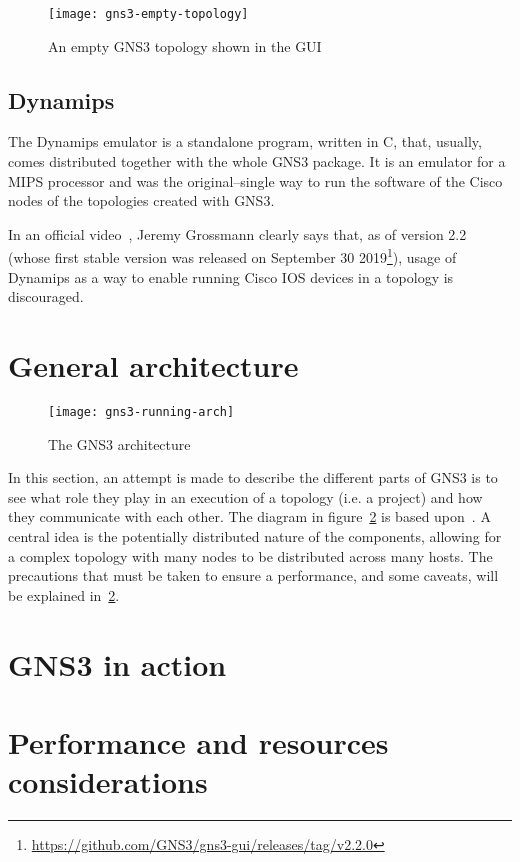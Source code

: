 \begin{figure}
  \centering
  \texttt{[image: gns3-empty-topology]}
  \caption{An empty GNS3 topology shown in the GUI}
  \label{fig:gns3-empty-topology}
\end{figure}

\subsection{Dynamips}
\label{subsec:gns3dynamips}

The Dynamips emulator is a standalone program, written in C, that, usually, comes distributed together with the whole GNS3 package.
It is an emulator for a MIPS processor and was the original--single way to run the software of the Cisco nodes of the topologies created with GNS3.

In an official video~\cite{ytdynamipsvpcs}, Jeremy Grossmann clearly says that, as of version 2.2 (whose first stable version was released on September 30 2019\footnote{\url{https://github.com/GNS3/gns3-gui/releases/tag/v2.2.0}}), usage of Dynamips as a way to enable running Cisco IOS devices in a topology is discouraged.


\section{General architecture}

\begin{figure}
  \centering
  \texttt{[image: gns3-running-arch]}
  \caption{The GNS3 architecture}
  \label{fig:gns3-running-arch}
\end{figure}

In this section, an attempt is made to describe the different parts of GNS3 is to see what role they play in an execution of a topology (i.e. a project) and how they communicate with each other.
The diagram in figure~\ref{fig:gns3-running-arch} is based upon~\cite{ytgns3arch22}.
A central idea is the potentially distributed nature of the components, allowing for a complex topology with many nodes to be distributed across many hosts.
The precautions that must be taken to ensure a performance, and some caveats, will be explained in~\ref{sec:gns3inaction}. %

\label{sec:gns3architecture}


\section{GNS3 in action}
\label{sec:gns3inaction}


\section{Performance and resources considerations}
\label{sec:gns3performance}


